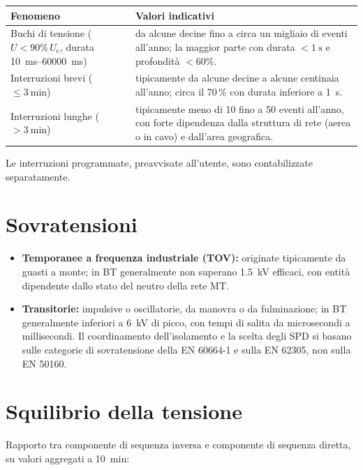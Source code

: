 \documentclass[11pt,a4paper]{article}
\newcommand{\Uc}{U_{\mathrm{c}}}
\begin{document}
\begin{table}[h]
\centering
\small
\begin{tabular}{p{}p{}}
\toprule
\textbf{Fenomeno} & \textbf{Valori indicativi} \\
\midrule
Buchi di tensione ($U < 90\%\,\Uc$, durata \SIrange{10}{60000}{ms}) &
da alcune decine fino a circa un migliaio di eventi all'anno; la maggior parte
con durata $<\SI{1}{\second}$ e profondità $<60\%$. \\
\addlinespace
Interruzioni brevi ($\le \SI{3}{\minute}$) &
tipicamente da alcune decine a alcune centinaia all'anno; circa il 70\,\% con
durata inferiore a \SI{1}{\second}. \\
\addlinespace
Interruzioni lunghe ($> \SI{3}{\minute}$) &
tipicamente meno di 10 fino a 50 eventi all'anno, con forte dipendenza dalla
struttura di rete (aerea o in cavo) e dall'area geografica. \\
\bottomrule
\end{tabular}
\end{table}

\noindent
Le interruzioni programmate, preavvisate all'utente, sono contabilizzate separatamente.

\section{Sovratensioni}

\begin{itemize}[itemsep=2pt]
  \item \textbf{Temporanee a frequenza industriale (TOV):} originate tipicamente da
        guasti a monte; in BT generalmente non superano \SI{1.5}{kV} efficaci, con
        entità dipendente dallo stato del neutro della rete MT.
  \item \textbf{Transitorie:} impulsive o oscillatorie, da manovra o da fulminazione;
        in BT generalmente inferiori a \SI{6}{kV} di picco, con tempi di salita
        da microsecondi a millisecondi. Il coordinamento dell'isolamento e la scelta
        degli SPD si basano sulle categorie di sovratensione della EN 60664-1
        e sulla EN 62305, non sulla EN 50160.
\end{itemize}

\section{Squilibrio della tensione}

Rapporto tra componente di sequenza inversa e componente di sequenza diretta,
su valori aggregati a \SI{10}{\minute}:
\end{document}
